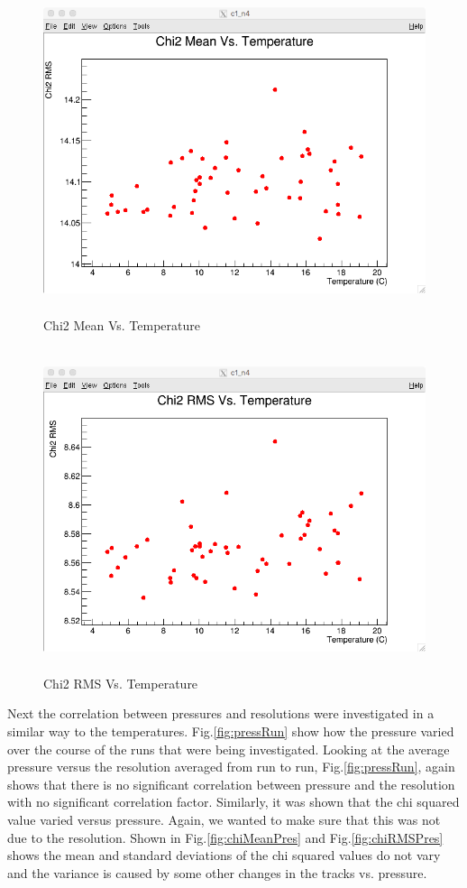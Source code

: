 \documentclass[./Thesis]{subfiles}
\begin{document}
\begin{figure}
	\centerline{\includegraphics[height=95mm]{Chi2MeanVsTemp.png}}
	\caption[Chi2 Mean Vs. Temperature]{Chi2 Mean Vs. Temperature}
	\label{fig:chiTemp}
\end{figure} 
	 
\begin{figure}
	\centerline{\includegraphics[height=95mm]{Chi2RMSVsTemp.png}}
	\caption[Chi2 RMS Vs. Temperature]{Chi2 RMS Vs. Temperature}
	\label{fig:chiRMS}
\end{figure} 	
	
		 
	 Next the correlation between pressures and resolutions were investigated in a similar way to the temperatures.  Fig.\ref{fig:pressRun} show how the pressure varied over the course of the runs that were being investigated. Looking at the average pressure versus the resolution averaged from run to run, Fig.\ref {fig:pressRun}, again shows that there is no significant correlation between pressure and the resolution with no significant correlation factor.  Similarly, it was shown that the chi squared value varied versus pressure.  Again, we wanted to make sure that this was not due to the resolution.  Shown in Fig.\ref{fig:chiMeanPres} and Fig.\ref{fig:chiRMSPres} shows the mean and standard deviations of the chi squared values do not vary and the variance is caused by some other changes in the tracks vs. pressure.
	 
\end{document}
